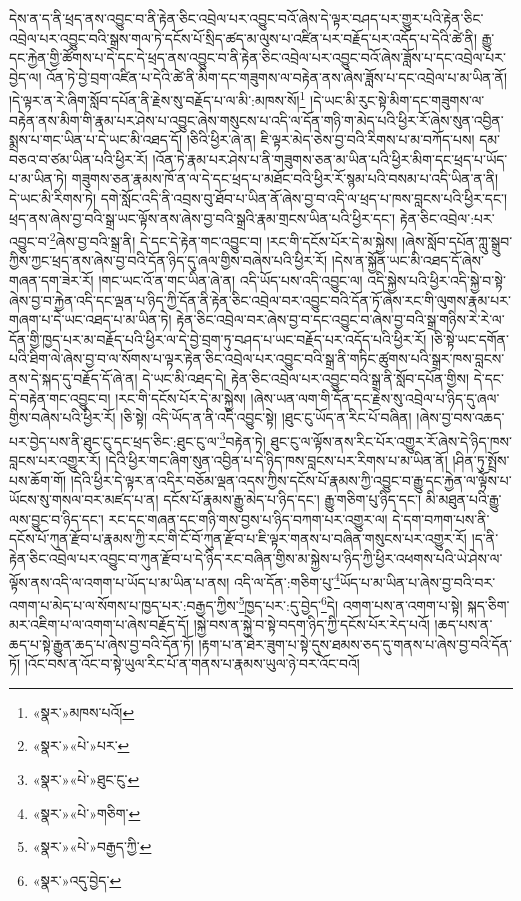 དེས་ན་ད་ནི་ཕྲད་ནས་འབྱུང་བ་ནི་རྟེན་ཅིང་འབྲེལ་པར་འབྱུང་བའོ་ཞེས་དེ་ལྟར་བཤད་པར་གྱུར་པའི་རྟེན་ཅིང་འབྲེལ་པར་འབྱུང་བའི་སྒྲས་གལ་ཏེ་དངོས་པོ་སྲིད་ཚད་མ་ལུས་པ་འཛིན་པར་བརྗོད་པར་འདོད་པ་དེའི་ཚེ་ནི། རྒྱུ་དང་རྐྱེན་གྱི་ཚོགས་པ་དེ་དང་དེ་ཕྲད་ནས་འབྱུང་བ་ནི་རྟེན་ཅིང་འབྲེལ་པར་འབྱུང་བའོ་ཞེས་ཟློས་པ་དང་འབྲེལ་པར་བྱེད་ལ། འོན་ཏེ་བྱེ་བྲག་འཛིན་པ་དེའི་ཚེ་ནི་མིག་དང་གཟུགས་ལ་བརྟེན་ནས་ཞེས་ཟློས་པ་དང་འབྲེལ་པ་མ་ཡིན་ནོ། །དེ་ལྟར་ན་རེ་ཞིག་སློབ་དཔོན་ནི་རྗེས་སུ་བརྗོད་པ་ལ་མི་:མཁས་སོ།\footnote{«སྣར་»མཁས་པའོ།} །དེ་ཡང་མི་རུང་སྟེ་མིག་དང་གཟུགས་ལ་བརྟེན་ནས་མིག་གི་རྣམ་པར་ཤེས་པ་འབྱུང་ཞེས་གསུངས་པ་འདི་ལ་དོན་གཉི་ག་མེད་པའི་ཕྱིར་རོ་ཞེས་སུན་འབྱིན་སྨྲས་པ་གང་ཡིན་པ་དེ་ཡང་མི་འཐད་དོ། །ཅིའི་ཕྱིར་ཞེ་ན། ཇི་ལྟར་མེད་ཅེས་བྱ་བའི་རིགས་པ་མ་བཀོད་པས། དམ་བཅའ་བ་ཙམ་ཡིན་པའི་ཕྱིར་རོ། །འོན་ཏེ་རྣམ་པར་ཤེས་པ་ནི་གཟུགས་ཅན་མ་ཡིན་པའི་ཕྱིར་མིག་དང་ཕྲད་པ་ཡོད་པ་མ་ཡིན་ཏེ། གཟུགས་ཅན་རྣམས་ཁོ་ན་ལ་དེ་དང་ཕྲད་པ་མཐོང་བའི་ཕྱིར་རོ་སྙམ་པའི་བསམ་པ་འདི་ཡིན་ན་ནི། དེ་ཡང་མི་རིགས་ཏེ། དགེ་སློང་འདི་ནི་འབྲས་བུ་ཐོབ་པ་ཡིན་ནོ་ཞེས་བྱ་བ་འདི་ལ་ཕྲད་པ་ཁས་བླངས་པའི་ཕྱིར་དང་། ཕྲད་ནས་ཞེས་བྱ་བའི་སྒྲ་ཡང་ལྟོས་ནས་ཞེས་བྱ་བའི་སྒྲའི་རྣམ་གྲངས་ཡིན་པའི་ཕྱིར་དང་། རྟེན་ཅིང་འབྲེལ་:པར་འབྱུང་བ་\footnote{«སྣར་»«པེ་»པར་}ཞེས་བྱ་བའི་སྒྲ་ནི། དེ་དང་དེ་རྟེན་གང་འབྱུང་བ། །རང་གི་དངོས་པོར་དེ་མ་སྐྱེས། །ཞེས་སློབ་དཔོན་ཀླུ་སྒྲུབ་ཀྱིས་ཀྱང་ཕྲད་ནས་ཞེས་བྱ་བའི་དོན་ཉིད་དུ་ཞལ་གྱིས་བཞེས་པའི་ཕྱིར་རོ། །དེས་ན་སྐྱོན་ཡང་མི་འཐད་དོ་ཞེས་གཞན་དག་ཟེར་རོ། །གང་ཡང་འོ་ན་གང་ཡིན་ཞེ་ན། འདི་ཡོད་པས་འདི་འབྱུང་ལ། འདི་སྐྱེས་པའི་ཕྱིར་འདི་སྐྱེ་བ་སྟེ་ཞེས་བྱ་བ་རྐྱེན་འདི་དང་ལྡན་པ་ཉིད་ཀྱི་དོན་ནི་རྟེན་ཅིང་འབྲེལ་བར་འབྱུང་བའི་དོན་ཏོ་ཞེས་རང་གི་ལུགས་རྣམ་པར་གཞག་པ་དེ་ཡང་འཐད་པ་མ་ཡིན་ཏེ། རྟེན་ཅིང་འབྲེལ་བར་ཞེས་བྱ་བ་དང་འབྱུང་བ་ཞེས་བྱ་བའི་སྒྲ་གཉིས་རེ་རེ་ལ་དོན་གྱི་ཁྱད་པར་མ་བརྗོད་པའི་ཕྱིར་ལ་དེ་བྱེ་བྲག་ཏུ་བཤད་པ་ཡང་བརྗོད་པར་འདོད་པའི་ཕྱིར་རོ། །ཅི་སྟེ་ཡང་དགོན་པའི་ཐིག་ལེ་ཞེས་བྱ་བ་ལ་སོགས་པ་ལྟར་རྟེན་ཅིང་འབྲེལ་པར་འབྱུང་བའི་སྒྲ་ནི་གཏིང་ཚུགས་པའི་སྒྲར་ཁས་བླངས་ནས་དེ་སྐད་དུ་བརྗོད་དོ་ཞེ་ན། དེ་ཡང་མི་འཐད་དེ། རྟེན་ཅིང་འབྲེལ་པར་འབྱུང་བའི་སྒྲ་ནི་སློབ་དཔོན་གྱིས། དེ་དང་དེ་བརྟེན་གང་འབྱུང་བ། །རང་གི་དངོས་པོར་དེ་མ་སྐྱེས། །ཞེས་ཡན་ལག་གི་དོན་དང་རྗེས་སུ་འབྲེལ་པ་ཉིད་དུ་ཞལ་གྱིས་བཞེས་པའི་ཕྱིར་རོ། །ཅི་སྟེ། འདི་ཡོད་ན་ནི་འདི་འབྱུང་སྟེ། །ཐུང་ངུ་ཡོད་ན་རིང་པོ་བཞིན། །ཞེས་བྱ་བས་འཆད་པར་བྱེད་པས་ནི་ཐུང་ངུ་དང་ཕྲད་ཅིང་:ཐུང་ངུ་ལ་\footnote{«སྣར་»«པེ་»ཐུང་ངུ་}བརྟེན་ཏེ། ཐུང་ངུ་ལ་ལྟོས་ནས་རིང་པོར་འགྱུར་རོ་ཞེས་དེ་ཉིད་ཁས་བླངས་པར་འགྱུར་རོ། །དེའི་ཕྱིར་གང་ཞིག་སུན་འབྱིན་པ་དེ་ཉིད་ཁས་བླངས་པར་རིགས་པ་མ་ཡིན་ནོ། །ཤིན་ཏུ་སྤྲོས་པས་ཆོག་གོ། །དེའི་ཕྱིར་དེ་ལྟར་ན་འདིར་བཅོམ་ལྡན་འདས་ཀྱིས་དངོས་པོ་རྣམས་ཀྱི་འབྱུང་བ་རྒྱུ་དང་རྐྱེན་ལ་ལྟོས་པ་ཡོངས་སུ་གསལ་བར་མཛད་པ་ན། དངོས་པོ་རྣམས་རྒྱུ་མེད་པ་ཉིད་དང་། རྒྱུ་གཅིག་པུ་ཉིད་དང་། མི་མཐུན་པའི་རྒྱུ་ལས་བྱུང་བ་ཉིད་དང་། རང་དང་གཞན་དང་གཉི་གས་བྱས་པ་ཉིད་བཀག་པར་འགྱུར་ལ། དེ་དག་བཀག་པས་ནི་དངོས་པོ་ཀུན་རྫོབ་པ་རྣམས་ཀྱི་རང་གི་ངོ་བོ་ཀུན་རྫོབ་པ་ཇི་ལྟར་གནས་པ་བཞིན་གསུངས་པར་འགྱུར་རོ། །ད་ནི་རྟེན་ཅིང་འབྲེལ་པར་འབྱུང་བ་ཀུན་རྫོབ་པ་དེ་ཉིད་རང་བཞིན་གྱིས་མ་སྐྱེས་པ་ཉིད་ཀྱི་ཕྱིར་འཕགས་པའི་ཡེ་ཤེས་ལ་ལྟོས་ནས་འདི་ལ་འགག་པ་ཡོད་པ་མ་ཡིན་པ་ནས། འདི་ལ་དོན་:གཅིག་པུ་\footnote{«སྣར་»«པེ་»གཅིག་}ཡོད་པ་མ་ཡིན་པ་ཞེས་བྱ་བའི་བར་འགག་པ་མེད་པ་ལ་སོགས་པ་ཁྱད་པར་:བརྒྱད་ཀྱིས་\footnote{«སྣར་»«པེ་»བརྒྱད་ཀྱི་}ཁྱད་པར་:དུ་བྱེད་\footnote{«སྣར་»འདུ་བྱེད་}དེ། འགག་པས་ན་འགག་པ་སྟེ། སྐད་ཅིག་མར་འཇིག་པ་ལ་འགག་པ་ཞེས་བརྗོད་དོ། །སྐྱེ་བས་ན་སྐྱེ་བ་སྟེ་བདག་ཉིད་ཀྱི་དངོས་པོར་རེད་པའོ། །ཆད་པས་ན་ཆད་པ་སྟེ་རྒྱུན་ཆད་པ་ཞེས་བྱ་བའི་དོན་ཏོ། །རྟག་པ་ན་ཐེར་ཟུག་པ་སྟེ་དུས་ཐམས་ཅད་དུ་གནས་པ་ཞེས་བྱ་བའི་དོན་ཏོ། །འོང་བས་ན་འོང་བ་སྟེ་ཡུལ་རིང་པོ་ན་གནས་པ་རྣམས་ཡུལ་ཉེ་བར་འོང་བའོ། 
